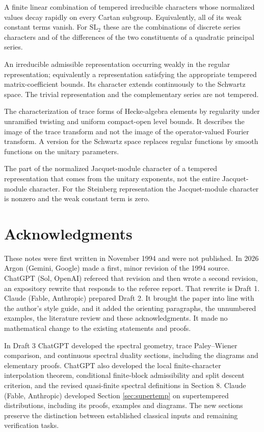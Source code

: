 \documentclass[12pt,letterpaper]{amsart}
\numberwithin{equation}{section}
\theoremstyle{definition}
\theoremstyle{remark}
\begin{document}
\begin{description}[style=nextline,leftmargin=1em]
\item[Supertempered virtual character] A finite linear combination of tempered irreducible characters whose normalized values decay rapidly on every Cartan subgroup. Equivalently, all of its weak constant terms vanish. For $\mathrm{SL}_2$ these are the combinations of discrete series characters and of the differences of the two constituents of a quadratic principal series.
\item[Tempered representation] An irreducible admissible representation occurring weakly in the regular representation; equivalently a representation satisfying the appropriate tempered matrix-coefficient bounds. Its character extends continuously to the Schwartz space. The trivial representation and the complementary series are not tempered.
\item[Trace Paley--Wiener theorem] The characterization of trace forms of Hecke-algebra elements by regularity under unramified twisting and uniform compact-open level bounds. It describes the image of the trace transform and not the image of the operator-valued Fourier transform. A version for the Schwartz space replaces regular functions by smooth functions on the unitary parameters.
\item[Weak constant term] The part of the normalized Jacquet-module character of a tempered representation that comes from the unitary exponents, not the entire Jacquet-module character. For the Steinberg representation the Jacquet-module character is nonzero and the weak constant term is zero.
\end{description}

\section*{Acknowledgments}
These notes were first written in November 1994 and were not published. In 2026 Argon (Gemini, Google) made a first, minor revision of the 1994 source. ChatGPT (Sol, OpenAI) refereed that revision and then wrote a second revision, an expository rewrite that responds to the referee report. That rewrite is Draft 1. Claude (Fable, Anthropic) prepared Draft 2. It brought the paper into line with the author's style guide, and it added the orienting paragraphs, the unnumbered examples, the literature review and these acknowledgments. It made no mathematical change to the existing statements and proofs.

In Draft 3 ChatGPT developed the spectral geometry, trace Paley--Wiener comparison, and continuous spectral duality sections, including the diagrams and elementary proofs. ChatGPT also developed the local finite-character interpolation theorem, conditional finite-block admissibility and split descent criterion, and the revised quasi-finite spectral definitions in Section 8. Claude (Fable, Anthropic) developed Section \ref{sec:supertemp} on supertempered distributions, including its proofs, examples and diagrams. The new sections preserve the distinction between established classical inputs and remaining verification tasks. 
\end{document}
